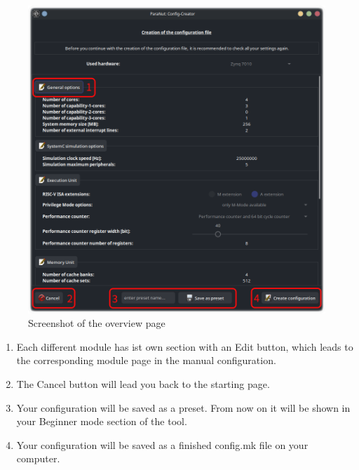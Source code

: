 \begin{figure}[!h]
    \noindent \begin{centering}
        \includegraphics[width=15cm]{images/pn_config_creator_final_page}
        \par\end{centering}
    \caption{Screenshot of the overview page}
\end{figure}

\begin{enumerate}
	\item Each different module has ist own section with an \glqq Edit\grqq{}  button, which leads to the corresponding module page in the manual configuration.
	\item The \glqq Cancel\grqq{}  button will lead you back to the starting page.
	\item Your configuration will be saved as a preset. From now on it will be shown in your Beginner mode section of the tool.
	\item Your configuration will be saved as a finished config.mk file on your computer.

\end{enumerate}

